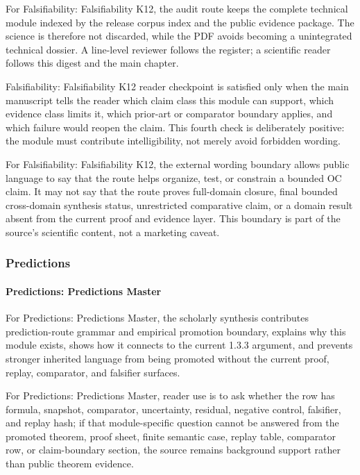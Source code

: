 For Falsifiability: Falsifiability K12, the audit route keeps the complete technical module indexed by the release corpus index and the public evidence package. The science is therefore not discarded, while the PDF avoids becoming a unintegrated technical dossier. A line-level reviewer follows the register; a scientific reader follows this digest and the main chapter.


Falsifiability: Falsifiability K12 reader checkpoint is satisfied only when the main manuscript tells the reader which claim class this module can support, which evidence class limits it, which prior-art or comparator boundary applies, and which failure would reopen the claim. This fourth check is deliberately positive: the module must contribute intelligibility, not merely avoid forbidden wording.


For Falsifiability: Falsifiability K12, the external wording boundary allows public language to say that the route helps organize, test, or constrain a bounded OC claim. It may not say that the route proves full-domain closure, final bounded cross-domain synthesis status, unrestricted comparative claim, or a domain result absent from the current proof and evidence layer. This boundary is part of the source's scientific content, not a marketing caveat.


\subsubsection{Predictions}

\paragraph{Predictions: Predictions Master}

For Predictions: Predictions Master, the scholarly synthesis contributes prediction-route grammar and empirical promotion boundary, explains why this module exists, shows how it connects to the current 1.3.3 argument, and prevents stronger inherited language from being promoted without the current proof, replay, comparator, and falsifier surfaces.


For Predictions: Predictions Master, reader use is to ask whether the row has formula, snapshot, comparator, uncertainty, residual, negative control, falsifier, and replay hash; if that module-specific question cannot be answered from the promoted theorem, proof sheet, finite semantic case, replay table, comparator row, or claim-boundary section, the source remains background support rather than public theorem evidence.


